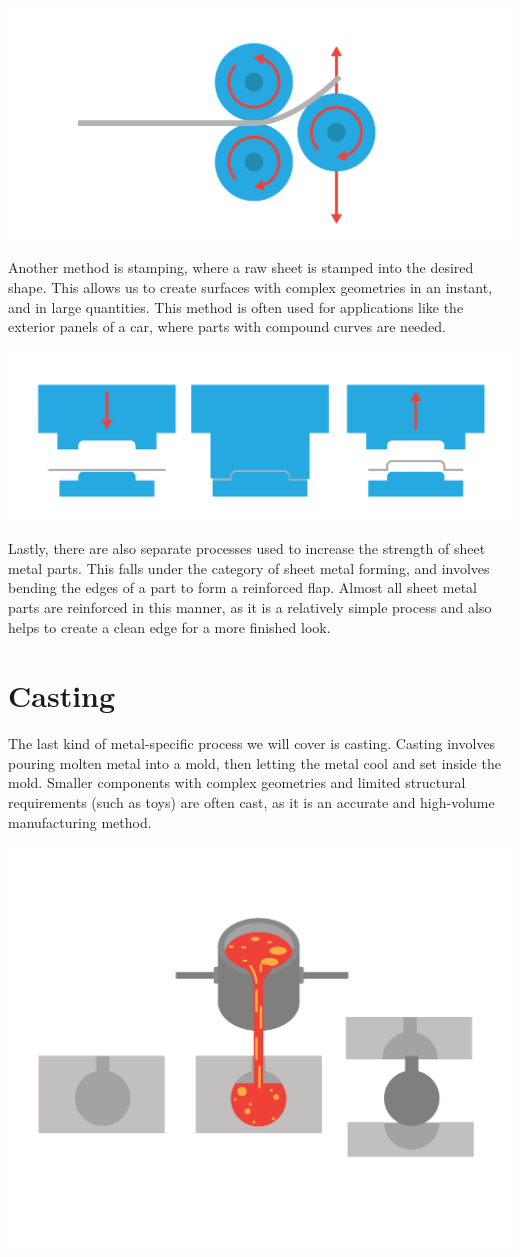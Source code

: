 \includegraphics[width=.75\textwidth]{rolling.png}


Another method is stamping, where a raw sheet is stamped into the desired shape. This allows us to create surfaces with complex geometries in an instant, and in large quantities. This method is often used for applications like the exterior panels of a car, where parts with compound curves are needed.

\includegraphics[width=.75\textwidth]{stamping.png}



Lastly, there are also separate processes used to increase the strength of sheet metal parts. This falls under the category of sheet metal forming, and involves bending the edges of a part to form a reinforced flap. Almost all sheet metal parts are reinforced in this manner, as it is a relatively simple process and also helps to create a clean edge for a more finished look.

\section{Casting}

The last kind of metal-specific process we will cover is casting. Casting involves pouring molten metal into a mold, then letting the metal cool and set inside the mold. Smaller components with complex geometries and limited structural requirements (such as toys) are often cast, as it is an accurate and high-volume manufacturing method.

\includegraphics[width=.75\textwidth]{casting.png}


